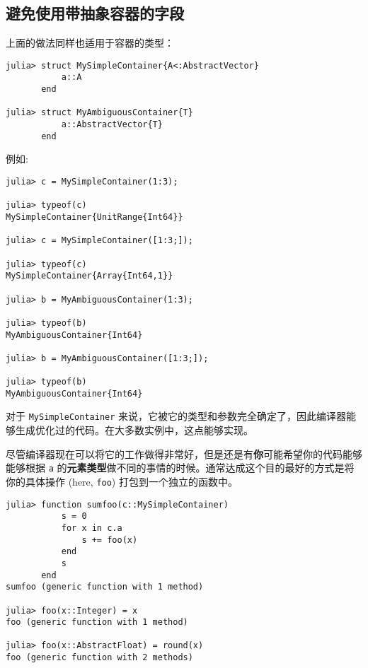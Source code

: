 \hypertarget{1665323452340421493}{}


\subsection{避免使用带抽象容器的字段}



上面的做法同样也适用于容器的类型：




\begin{verbatim}
julia> struct MySimpleContainer{A<:AbstractVector}
           a::A
       end

julia> struct MyAmbiguousContainer{T}
           a::AbstractVector{T}
       end
\end{verbatim}



例如:




\begin{verbatim}
julia> c = MySimpleContainer(1:3);

julia> typeof(c)
MySimpleContainer{UnitRange{Int64}}

julia> c = MySimpleContainer([1:3;]);

julia> typeof(c)
MySimpleContainer{Array{Int64,1}}

julia> b = MyAmbiguousContainer(1:3);

julia> typeof(b)
MyAmbiguousContainer{Int64}

julia> b = MyAmbiguousContainer([1:3;]);

julia> typeof(b)
MyAmbiguousContainer{Int64}
\end{verbatim}



对于 \texttt{MySimpleContainer} 来说，它被它的类型和参数完全确定了，因此编译器能够生成优化过的代码。在大多数实例中，这点能够实现。



尽管编译器现在可以将它的工作做得非常好，但是还是有\textbf{你}可能希望你的代码能够能够根据 \texttt{a} 的\textbf{元素类型}做不同的事情的时候。通常达成这个目的最好的方式是将你的具体操作 (here, \texttt{foo}) 打包到一个独立的函数中。




\begin{verbatim}
julia> function sumfoo(c::MySimpleContainer)
           s = 0
           for x in c.a
               s += foo(x)
           end
           s
       end
sumfoo (generic function with 1 method)

julia> foo(x::Integer) = x
foo (generic function with 1 method)

julia> foo(x::AbstractFloat) = round(x)
foo (generic function with 2 methods)
\end{verbatim}



